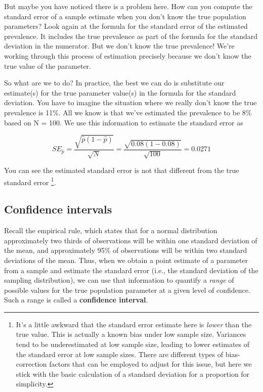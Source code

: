 \documentclass[
]{book}
\begin{document}
But maybe you have noticed there is a problem here. How can you compute the standard error of a sample estimate when you don't know the true population parameters? Look again at the formula for the standard error of the estimated prevalence. It includes the true prevalence as part of the formula for the standard deviation in the numerator. But we don't know the true prevalence! We're working through this process of estimation precisely because we don't know the true value of the parameter.

So what are we to do? In practice, the best we can do is substitute our estimate(s) for the true parameter value(s) in the formula for the standard deviation. You have to imagine the situation where we really don't know the true prevalence is 11\%. All we know is that we've estimated the prevalence to be 8\% based on N = 100. We use this information to estimate the standard error as

\[
SE_{\hat{p}} = \frac{\sqrt{\hat{p}(1-\hat{p})}}{\sqrt{N}} =\frac{\sqrt{0.08(1-0.08)}}{\sqrt{100}} = 0.0271
\]

You can see the estimated standard error is not that different from the true standard error \footnote{It's a little awkward that the standard error estimate here is \emph{lower} than the true value. This is actually a known bias under low sample size. Variances tend to be underestimated at low sample size, leading to lower estimates of the standard error at low sample sizes. There are different types of bias-correction factors that can be employed to adjust for this issue, but here we stick with the basic calculation of a standard deviation for a proportion for simplicity.}.

\subsection{Confidence intervals}\label{confidence-intervals}

Recall the empirical rule, which states that for a normal distribution approximately two thirds of observations will be within one standard deviation of the mean, and approximately 95\% of observations will be within two standard deviations of the mean. Thus, when we obtain a point estimate of a parameter from a sample and estimate the standard error (i.e., the standard deviation of the sampling distribution), we can use that information to quantify a \emph{range} of possible values for the true population parameter at a given level of confidence. Such a range is called a \textbf{confidence interval}.
\end{document}
